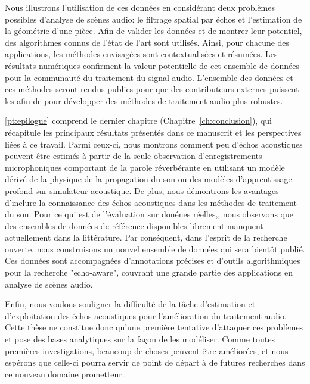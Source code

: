 \begin{itemize}
    Nous illustrons l'utilisation de ces données en considérant deux problèmes possibles d'analyse de scènes audio:
    le filtrage spatial par échos et l'estimation de la géométrie d'une pièce.
    Afin de valider les données et de montrer leur potentiel, des algorithmes connus de l'état de l'art sont utilisés.
    Ainsi, pour chacune des applications, les méthodes envisagées sont contextualisées et résumées.
    Les résultats numériques confirment la valeur potentielle de cet ensemble de données pour la communauté du traitement du signal audio.
    L'ensemble des données et ces méthodes seront rendus publics pour que des contributeurs externes puissent les afin de pour développer des méthodes de traitement audio plus robustes.
\end{itemize}

\ref{pt:epilogue} comprend le dernier chapitre (Chapitre~\ref{ch:conclusion}), qui récapitule les principaux résultats présentés dans ce manuscrit et les perspectives liées à ce travail.
Parmi ceux-ci, nous montrons comment peu d'échos acoustiques peuvent être estimés à partir de la seule observation d'enregistrements microphoniques comportant de la parole réverbérante en utilisant un modèle dérivé de la physique de la propagation du son ou des modèles d'apprentissage profond sur simulateur acoustique.
De plus, nous démontrons les avantages d'inclure la connaissance des échos acoustiques dans les méthodes de traitement du son.
Pour ce qui est de l'évaluation sur donénes réelles,, nous observons que des ensembles de données de référence disponibles librement manquent actuellement dans la littérature.
Par conséquent, dans l'esprit de la recherche ouverte, nous construisons un nouvel ensemble de données qui sera bientôt publié.
Ces données sont accompagnées d'annotations précises et d'outils algorithmiques pour la recherche "echo-aware", couvrant une grande partie des applications en analyse de scènes audio.

\mynewline
Enfin, nous voulons souligner la difficulté de la tâche d'estimation et d'exploitation des échos acoustiques pour l'amélioration du traitement audio.
Cette thèse ne constitue donc qu'une première tentative d'attaquer ces problèmes et pose des bases analytiques sur la façon de les modéliser.
Comme toutes premières investigations, beaucoup de choses peuvent être améliorées, et nous espérons que celle-ci pourra servir de point de départ à de futures recherches dans ce nouveau domaine prometteur.